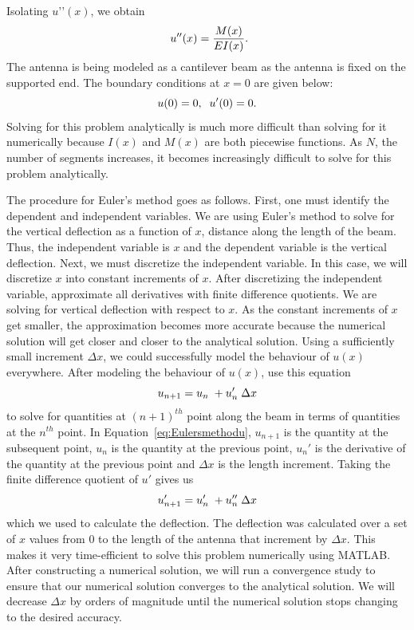 \documentclass[12pt]{article}
\begin{document}
Isolating $u’’(x)$, we obtain 
\begin{equation}\label{eq:Deflection}
    \centering
    \ u''(x) = \frac{M(x)}{EI(x)}.
\end{equation}
The antenna is being modeled as a cantilever beam as the antenna is fixed on the supported end. The boundary conditions at $x = 0$ are given below:
\begin{equation}
    \centering
    u(0) = 0,\; \;u'(0) = 0.
\end{equation}
Solving for this problem analytically is much more difficult than solving for it numerically because $I(x)$ and $M(x)$ are both piecewise functions. As $N$, the number of segments increases, it becomes increasingly difficult to solve for this problem analytically.

The procedure for Euler’s method goes as follows. First, one must identify the dependent and independent variables. We are using Euler’s method to solve for the vertical deflection as a function of $x$, distance along the length of the beam. Thus, the independent variable is $x$ and the dependent variable is the vertical deflection. Next, we must discretize the independent variable. In this case, we will discretize $x$ into constant increments of $x$. After discretizing the independent variable, approximate all derivatives with finite difference quotients. We are solving for vertical deflection with respect to $x$. As the constant increments of $x$ get smaller, the approximation becomes more accurate because the numerical solution will get closer and closer to the analytical solution. Using a sufficiently small increment $\Delta{x}$, we could successfully model the behaviour of $u(x)$ everywhere. After modeling the behaviour of $u(x)$, use this equation 
\begin{equation}\label{eq:Eulersmethodu}
    \centering
    u_{n+1} = {u_n}\;+u_n'\; \Delta{x}
\end{equation}
to solve for quantities at $(n+1)^{th}$ point along the beam in terms of quantities at the $n^{th}$ point. In Equation~\eqref{eq:Eulersmethodu}, $u_{n+1}$ is the quantity at the subsequent point, $u_n$ is the quantity at the previous point, $u_n'$ is the derivative of the quantity at the previous point and $\Delta{x}$ is the length increment. Taking the finite difference quotient of $u'$ gives us
\begin{equation}
    \centering
    u_{n+1}' = u_n'\;+u_n''\; \Delta{x}
\end{equation}
which we used to calculate the deflection. The deflection was calculated over a set of $x$ values from 0 to the length of the antenna that increment by $\Delta{x}$. This makes it very time-efficient to solve this problem numerically using MATLAB. After constructing a numerical solution, we will run a convergence study to ensure that our numerical solution converges to the analytical solution. We will decrease $\Delta{x}$ by orders of magnitude until the numerical solution stops changing to the desired accuracy.
\end{document}
